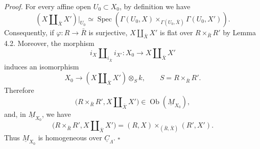 \medskip
\noindent\textit{Proof.}
For every affine open $U_0\subset X_0$, by definition we have
\[
 (X\amalg_{\bar X}X')|_{U_0}
 \simeq
 \operatorname{Spec}\!\left(
   \Gamma(U_0,X)
   \times_{\Gamma(U_0,\bar X)}
   \Gamma(U_0,X')
 \right).
\]
Consequently, if $\varphi:R\longrightarrow\bar R$ is surjective,
$X\amalg_{\bar X}X'$ is flat over $R\times_{\bar R}R'$ by Lemma
4.2. Moreover, the morphism
\[
 i_X\amalg_{i_{\bar X}}i_{X'}:
 X_0\longrightarrow X\amalg_{\bar X}X'
\]
induces an isomorphism
\[
 X_0\longrightarrow (X\amalg_{\bar X}X')\otimes_Sk,
 \qquad S=R\times_{\bar R}R'.
\]
Therefore
\[
 \bigl(R\times_{\bar R}R',X\amalg_{\bar X}X'\bigr)
 \in\operatorname{Ob}(\underline M_{X_0}),
\]
and, in $\underline M_{X_0}$, we have
\[
 \bigl(R\times_{\bar R}R',X\amalg_{\bar X}X'\bigr)
 =
 (R,X)\times_{(\bar R,\bar X)}(R',X').
\]
Thus $\underline M_{X_0}$ is homogeneous over
$\underline C_\Lambda$. \hfill$\square$

